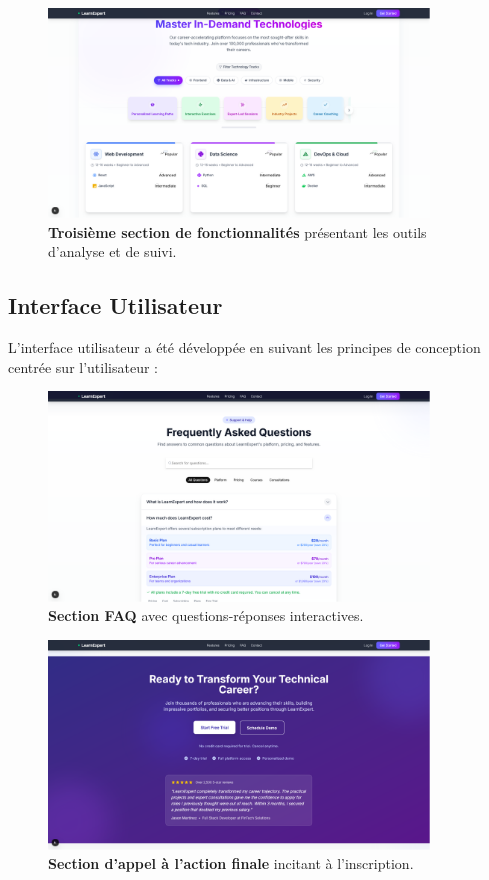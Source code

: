 \begin{figure}[h!]
  \centering
  \includegraphics[width=0.9\textwidth,keepaspectratio]{week_2_img/fetchersection_3.png}
  \caption{\textbf{Troisième section de fonctionnalités} présentant les outils d'analyse et de suivi.}
  \label{fig:features_section_3}
\end{figure}

\subsection{Interface Utilisateur}
L'interface utilisateur a été développée en suivant les principes de conception centrée sur l'utilisateur :

\begin{figure}[h!]
  \centering
  \includegraphics[width=0.9\textwidth,keepaspectratio]{week_2_img/faqsection.png}
  \caption{\textbf{Section FAQ} avec questions-réponses interactives.}
  \label{fig:faq_section}
\end{figure}

\begin{figure}[h!]
  \centering
  \includegraphics[width=0.9\textwidth,keepaspectratio]{week_2_img/second_call_of_action.png}
  \caption{\textbf{Section d'appel à l'action finale} incitant à l'inscription.}
  \label{fig:final_cta}
\end{figure}

